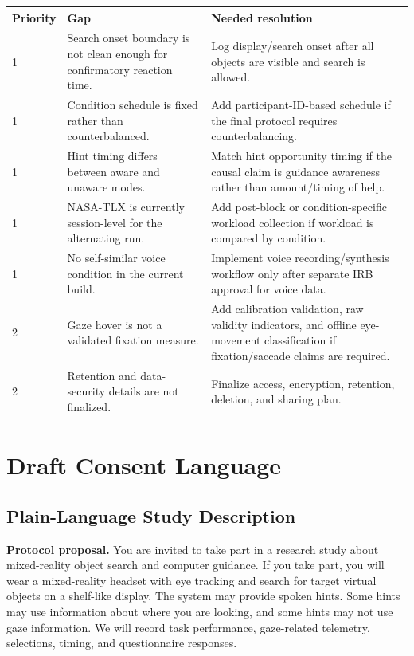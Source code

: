 \documentclass[11pt,letterpaper]{article}
\newcommand{\status}[1]{\textbf{#1.}}
\newcommand{\field}[1]{\textbf{#1}}
\begin{document}
\begin{longtable}{p{}p{}p{}}
\toprule
\field{Priority} & \field{Gap} & \field{Needed resolution} \\
\midrule
1 & Search onset boundary is not clean enough for confirmatory reaction time. & Log display/search onset after all objects are visible and search is allowed. \\
1 & Condition schedule is fixed rather than counterbalanced. & Add participant-ID-based schedule if the final protocol requires counterbalancing. \\
1 & Hint timing differs between aware and unaware modes. & Match hint opportunity timing if the causal claim is guidance awareness rather than amount/timing of help. \\
1 & NASA-TLX is currently session-level for the alternating run. & Add post-block or condition-specific workload collection if workload is compared by condition. \\
1 & No self-similar voice condition in the current build. & Implement voice recording/synthesis workflow only after separate IRB approval for voice data. \\
2 & Gaze hover is not a validated fixation measure. & Add calibration validation, raw validity indicators, and offline eye-movement classification if fixation/saccade claims are required. \\
2 & Retention and data-security details are not finalized. & Finalize access, encryption, retention, deletion, and sharing plan. \\
\bottomrule
\end{longtable}

\section{Draft Consent Language}

\subsection{Plain-Language Study Description}

\status{Protocol proposal} You are invited to take part in a research study about mixed-reality object search and computer guidance. If you take part, you will wear a mixed-reality headset with eye tracking and search for target virtual objects on a shelf-like display. The system may provide spoken hints. Some hints may use information about where you are looking, and some hints may not use gaze information. We will record task performance, gaze-related telemetry, selections, timing, and questionnaire responses.
\end{document}
